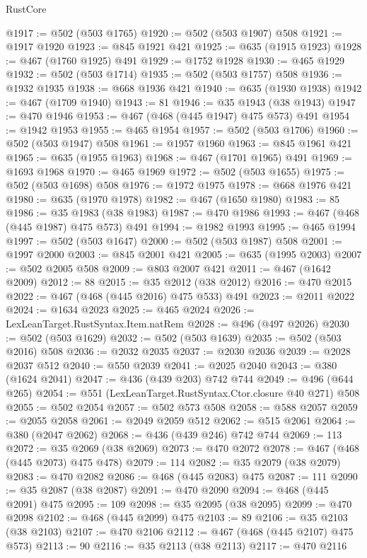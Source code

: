 \begin{lexlean}{RustCore}
\begin{coremodule}
@1917 := @502 (@503 @1765)
@1920 := @502 (@503 @1907) @508
@1921 := @1917 @1920
@1923 := @845 @1921 @421
@1925 := @635 (@1915 @1923)
@1928 := @467 (@1760 @1925) @491
@1929 := @1752 @1928
@1930 := @465 @1929
@1932 := @502 (@503 @1714)
@1935 := @502 (@503 @1757) @508
@1936 := @1932 @1935
@1938 := @668 @1936 @421
@1940 := @635 (@1930 @1938)
@1942 := @467 (@1709 @1940)
@1943 := 81
@1946 := @35 @1943 (@38 @1943)
@1947 := @470 @1946
@1953 := @467 (@468 (@445 @1947) @475 @573) @491
@1954 := @1942 @1953
@1955 := @465 @1954
@1957 := @502 (@503 @1706)
@1960 := @502 (@503 @1947) @508
@1961 := @1957 @1960
@1963 := @845 @1961 @421
@1965 := @635 (@1955 @1963)
@1968 := @467 (@1701 @1965) @491
@1969 := @1693 @1968
@1970 := @465 @1969
@1972 := @502 (@503 @1655)
@1975 := @502 (@503 @1698) @508
@1976 := @1972 @1975
@1978 := @668 @1976 @421
@1980 := @635 (@1970 @1978)
@1982 := @467 (@1650 @1980)
@1983 := 85
@1986 := @35 @1983 (@38 @1983)
@1987 := @470 @1986
@1993 := @467 (@468 (@445 @1987) @475 @573) @491
@1994 := @1982 @1993
@1995 := @465 @1994
@1997 := @502 (@503 @1647)
@2000 := @502 (@503 @1987) @508
@2001 := @1997 @2000
@2003 := @845 @2001 @421
@2005 := @635 (@1995 @2003)
@2007 := @502 @2005 @508
@2009 := @803 @2007 @421
@2011 := @467 (@1642 @2009)
@2012 := 88
@2015 := @35 @2012 (@38 @2012)
@2016 := @470 @2015
@2022 := @467 (@468 (@445 @2016) @475 @533) @491
@2023 := @2011 @2022
@2024 := @1634 @2023
@2025 := @465 @2024
@2026 := LexLeanTarget.RustSyntax.Item.natRem
@2028 := @496 (@497 @2026)
@2030 := @502 (@503 @1629)
@2032 := @502 (@503 @1639)
@2035 := @502 (@503 @2016) @508
@2036 := @2032 @2035
@2037 := @2030 @2036
@2039 := @2028 @2037 @512
@2040 := @550 @2039
@2041 := @2025 @2040
@2043 := @380 (@1624 @2041)
@2047 := @436 (@439 @203) @742 @744
@2049 := @496 (@644 @265)
@2054 := @551 (LexLeanTarget.RustSyntax.Ctor.closure @40 @271) @508
@2055 := @502 @2054
@2057 := @502 @573 @508
@2058 := @588 @2057
@2059 := @2055 @2058
@2061 := @2049 @2059 @512
@2062 := @515 @2061
@2064 := @380 (@2047 @2062)
@2068 := @436 (@439 @246) @742 @744
@2069 := 113
@2072 := @35 @2069 (@38 @2069)
@2073 := @470 @2072
@2078 := @467 (@468 (@445 @2073) @475 @478)
@2079 := 114
@2082 := @35 @2079 (@38 @2079)
@2083 := @470 @2082
@2086 := @468 (@445 @2083) @475
@2087 := 111
@2090 := @35 @2087 (@38 @2087)
@2091 := @470 @2090
@2094 := @468 (@445 @2091) @475
@2095 := 109
@2098 := @35 @2095 (@38 @2095)
@2099 := @470 @2098
@2102 := @468 (@445 @2099) @475
@2103 := 89
@2106 := @35 @2103 (@38 @2103)
@2107 := @470 @2106
@2112 := @467 (@468 (@445 @2107) @475 @573)
@2113 := 90
@2116 := @35 @2113 (@38 @2113)
@2117 := @470 @2116

\end{coremodule}
\end{lexlean}
